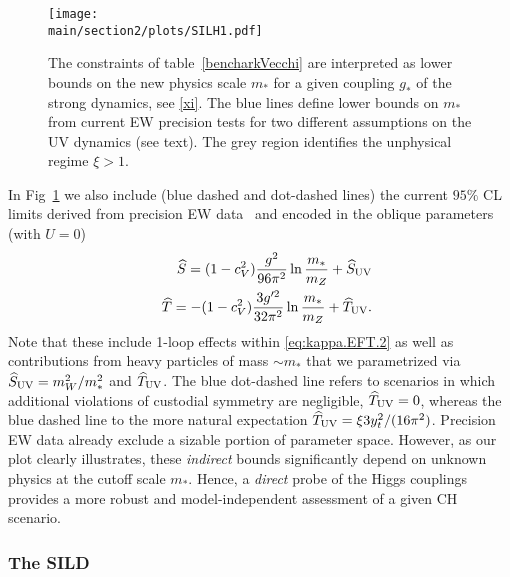 \begin{figure}[t]
\begin{center}
\texttt{[image: \\main/section2/plots/SILH1.pdf]}
\caption{The constraints of table~\ref{bencharkVecchi} are interpreted as lower bounds on the new physics scale $m_*$ for a given coupling $g_*$ of the strong dynamics, see \eqref{xi}. The blue lines define lower bounds on $m_*$ from current EW precision tests for two different assumptions on the UV dynamics (see text). The grey region identifies the unphysical regime $\xi>1$. 
}\label{SILH}
\end{center}
\end{figure}



In Fig~\ref{SILH} we also include (blue dashed and dot-dashed lines) the current $95\%$ CL limits derived from precision EW data~\cite{Baak:2014ora} and encoded in the oblique parameters (with $U=0$)
\begin{eqnarray}
&&{\widehat S}=(1-c_V^2)\frac{g^2}{96\pi^2}\ln\frac{m_*}{m_Z}+{\widehat S}_{\rm UV}%
\\\nonumber
&&{\widehat T}=-(1-c_V^2)\frac{3g'^2}{32\pi^2}\ln\frac{m_*}{m_Z}+{\widehat T}_{\rm UV}.%
\end{eqnarray}
Note that these include 1-loop effects within \eqref{eq:kappa.EFT.2} as well as contributions from heavy particles of mass $\sim m_*$ that we parametrized via $\widehat S_{\rm UV}={m_W^2}/{m_*^2}$ and $\widehat T_{\rm UV}$. The blue dot-dashed line refers to scenarios in which additional violations of custodial symmetry are negligible, $\widehat T_{\rm UV}=0$, whereas the blue dashed line to the more natural expectation $\widehat T_{\rm UV}=\xi 3y_t^2/(16\pi^2)$. Precision EW data already exclude a sizable portion of parameter space. However, as our plot clearly illustrates, these {\emph{indirect}} bounds significantly depend on unknown physics at the cutoff scale $m_*$. Hence, a {\emph{direct}} probe of the Higgs couplings provides a more robust and model-independent assessment of a given CH scenario.








\subsubsection{The SILD}

